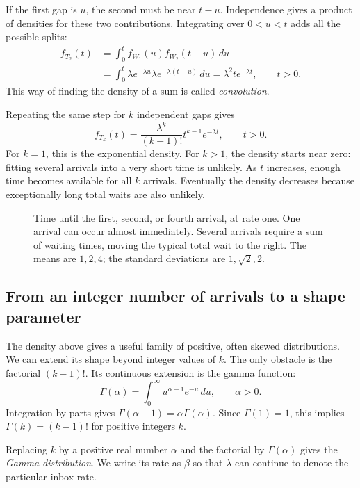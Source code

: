 If the first gap is \(u\), the second must be near \(t-u\).
Independence gives a product of densities for these two contributions.
Integrating over \(0<u<t\) adds all the possible splits:
\begin{align*}
  f_{T_2}(t)
  &=\int_0^t f_{W_1}(u)f_{W_2}(t-u)\,du\\
  &=\int_0^t\lambda e^{-\lambda u}
       \lambda e^{-\lambda(t-u)}\,du
   =\lambda^2 t e^{-\lambda t},\qquad t>0.
\end{align*}
This way of finding the density of a sum is called \emph{convolution}.

Repeating the same step for \(k\) independent gaps gives
\[
  f_{T_k}(t)=\frac{\lambda^k}{(k-1)!}t^{k-1}e^{-\lambda t},
  \qquad t>0.
\]
For \(k=1\), this is the exponential density. For \(k>1\), the density
starts near zero: fitting several arrivals into a very short time is
unlikely. As \(t\) increases, enough time becomes available for all
\(k\) arrivals. Eventually the density decreases because exceptionally
long total waits are also unlikely.

\begin{figure}[htbp]
  \centering
  
  \caption{Time until the first, second, or fourth arrival, at rate one.
  One arrival can occur almost immediately. Several arrivals require a sum
  of waiting times, moving the typical total wait to the right.
  The means are \(1,2,4\); the standard deviations are \(1,\sqrt2,2\).}
  \label{fig:waiting-times}
\end{figure}

\subsection{From an integer number of arrivals to a shape parameter}

The density above gives a useful family of positive, often skewed
distributions. We can extend its shape beyond integer values of \(k\).
The only obstacle is the factorial \((k-1)!\). Its continuous extension
is the gamma function:
\[
  \Gamma(\alpha)=\int_0^\infty u^{\alpha-1}e^{-u}\,du,\qquad\alpha>0.
\]
Integration by parts gives
\(\Gamma(\alpha+1)=\alpha\Gamma(\alpha)\). Since \(\Gamma(1)=1\), this
implies \(\Gamma(k)=(k-1)!\) for positive integers \(k\).

Replacing \(k\) by a positive real number \(\alpha\) and the factorial by
\(\Gamma(\alpha)\) gives the \emph{Gamma distribution}. We write its rate
as \(\beta\) so that \(\lambda\) can continue to denote the particular
inbox rate.

